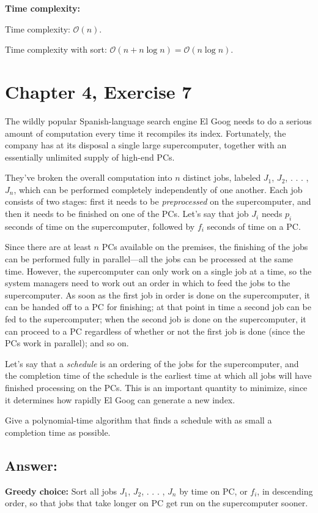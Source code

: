 \documentclass[12pt, letterpaper]{article}
\begin{document}
\vspace{7.5mm}
\noindent\textbf{Time complexity:} 

\noindent Time complexity: $\mathcal{O}(n)$.

\noindent Time complexity with sort: $\mathcal{O}(n + n\log n) = \mathcal{O}(n\log n)$.


\clearpage
\section{Chapter 4, Exercise 7}
The wildly popular Spanish-language search engine El Goog needs to do a serious amount of computation every time it recompiles its index. Fortunately, the company has at its disposal a single large supercomputer, together with an essentially unlimited supply of high-end PCs.

They've broken the overall computation into $n$ distinct jobs, labeled $J_1$, $J_2$, . . . , $J_n$, which can be performed completely independently of one another. Each job consists of two stages: first it needs to be \textit{preprocessed} on the supercomputer, and then it needs to be finished on one of the PCs. Let's say that job $J_i$ needs $p_i$ seconds of time on the supercomputer, followed by $f_i$ seconds of time on a PC.

Since there are at least $n$ PCs available on the premises, the finishing of the jobs can be performed fully in parallel—all the jobs can be processed at the same time. However, the supercomputer can only work on a single job at a time, so the system managers need to work out an order in which to feed the jobs to the supercomputer. As soon as the first job in order is done on the supercomputer, it can be handed off to a PC for finishing; at that point in time a second job can be fed to the supercomputer; when the second job is done on the supercomputer, it can proceed to a PC regardless of whether or not the first job is done (since the PCs work in parallel); and so on.

Let's say that a \textit{schedule} is an ordering of the jobs for the supercomputer, and the completion time of the schedule is the earliest time at which all jobs will have finished processing on the PCs. This is an important quantity to minimize, since it determines how rapidly El Goog can generate a new index.

Give a polynomial-time algorithm that finds a schedule with as small a completion time as possible.

\clearpage
\subsection*{Answer:}
\vspace{7.5mm}
\noindent \textbf{Greedy choice:} Sort all jobs $J_1$, $J_2$, . . . , $J_n$ by time on PC, or $f_i$, in descending order, so that jobs that take longer on PC get run on the supercomputer sooner.
\end{document}

